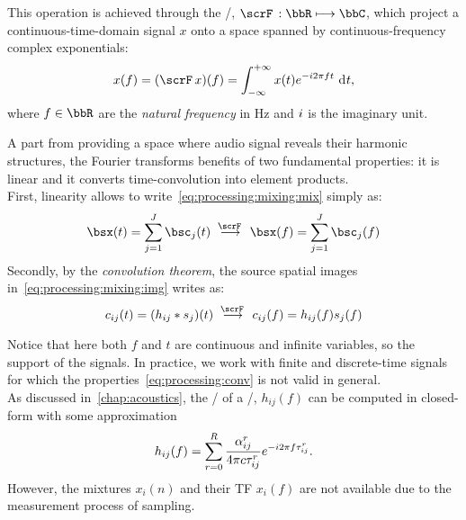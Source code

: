 This operation is achieved through the \FTdef/, $\fourierTrans{}:\bbR\kmapsto\bbC$, which
project a continuous-time-domain signal $x$ onto a space spanned by continuous-frequency complex exponentials:
\begin{equation}\label{eq:processing:ft}
    x(f) = (\fourierTrans{x})(f) =
        \int_{-\infty}^{+\infty}
        x(t)
        \cste^{-\csti 2 \pi f t}
        \,\kdiff{t}
    ,
\end{equation}
where $f \in \bbR$ are the \textit{natural frequency} in $\si{\Hz}$ and ${i}$ is the imaginary unit.

A part from providing a space where audio signal reveals their harmonic structures, the Fourier transforms benefits of two fundamental properties:
it is linear and it converts time-convolution into element products.
\\First, linearity allows to write~\cref{eq:processing:mixing:mix} simply as:
\begin{equation}\label{eq:processing:ft:mix}
    \mics( t) = \sum_{\idxSrc=1}^{\numSrcs} \imgs_\idxSrc( t)
    \;\overset{\fourierTrans{}}{\kto}\;
    \mics( f) = \sum_{\idxSrc=1}^{\numSrcs} \imgs_\idxSrc( f)
\end{equation}
Secondly, by the \textit{convolution theorem}, the source spatial images in~\cref{eq:processing:mixing:img} writes as:
\begin{equation}\label{eq:processing:conv}
    \img_{\idxMic\idxSrc}( t) =  \kparen{h_{\idxMic\idxSrc} \conv \src_\idxSrc} ( t)
    \;\overset{\fourierTrans{}}{\kto}\;
    \img_{\idxMic\idxSrc}( f) =  h_{\idxMic\idxSrc}( f) \src_\idxSrc( f)
\end{equation}

Notice that here both $f$ and $t$ are continuous and infinite variables, so the support of the signals.
In practice, we work with finite and discrete-time signals for which the properties~\eqref{eq:processing:conv} is not valid in general.
\\As discussed in~\cref{chap:acoustics}, the \FT/ of a \RIR/, $h_{ij}( f)$
can be computed in closed-form with some approximation
\begin{equation}\label{eq:processing:rir:ft}
    h_{ij}( f) = \sum_{r=0}^{R}
                    \frac{\alpha_{ij}^r}{4 \pi c \tau_{ij}^r}
                    {e}^{- {i} 2 \pi f \tau_{ij}^r}
    .
\end{equation}
However, the mixtures $x_i( n)$ and their TF $x_i( f)$ are not available due to the measurement process of sampling.

